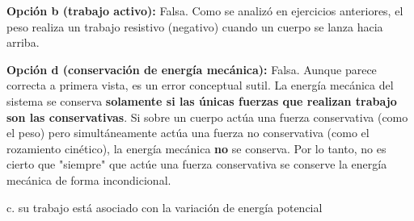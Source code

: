 \documentclass[12pt, a4paper]{article}
\begin{document}
\textbf{Opción b (trabajo activo):} Falsa. Como se analizó en ejercicios anteriores, el peso realiza un trabajo resistivo (negativo) cuando un cuerpo se lanza hacia arriba.

\textbf{Opción d (conservación de energía mecánica):} Falsa. Aunque parece correcta a primera vista, es un error conceptual sutil. La energía mecánica del sistema se conserva \textbf{solamente si las únicas fuerzas que realizan trabajo son las conservativas}. Si sobre un cuerpo actúa una fuerza conservativa (como el peso) pero simultáneamente actúa una fuerza no conservativa (como el rozamiento cinético), la energía mecánica \textbf{no} se conserva. Por lo tanto, no es cierto que "siempre" que actúe una fuerza conservativa se conserve la energía mecánica de forma incondicional.

\begin{tcolorbox}[colback=green!5!white, colframe=green!50!black, title=Respuesta Correcta]
\centering \Large c. su trabajo está asociado con la variación de energía potencial
\end{tcolorbox}
\end{document}
